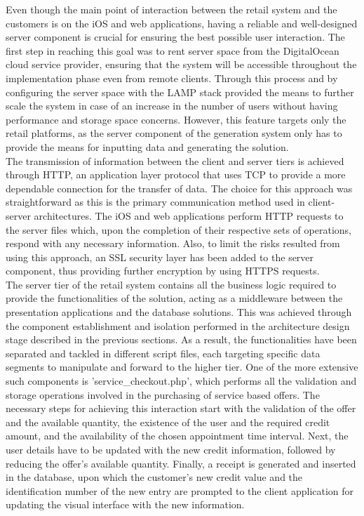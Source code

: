 Even though the main point of interaction between the retail system and the customers is on the iOS and web applications, having a reliable and well-designed server component is crucial for ensuring the best possible user interaction. The first step in reaching this goal was to rent server space from the DigitalOcean cloud service provider, ensuring that the system will be accessible throughout the implementation phase even from remote clients. Through this process and by configuring the server space with the LAMP stack provided the means to further scale the system in case of an increase in the number of users without having performance and storage space concerns. However, this feature targets only the retail platforms, as the server component of the generation system only has to provide the means for inputting data and generating the solution.\\

The transmission of information between the client and server tiers is achieved through HTTP, an application layer protocol that uses TCP to provide a more dependable connection for the transfer of data. The choice for this approach was straightforward as this is the primary communication method used in client-server architectures. The iOS and web applications perform HTTP requests to the server files which, upon the completion of their respective sets of operations, respond with any necessary information. Also, to limit the risks resulted from using this approach, an SSL security layer has been added to the server component, thus providing further encryption by using HTTPS requests.\\

The server tier of the retail system contains all the business logic required to provide the functionalities of the solution, acting as a middleware between the presentation applications and the database solutions. This was achieved through the component establishment and isolation performed in the architecture design stage described in the previous sections. As a result, the functionalities have been separated and tackled in different script files, each targeting specific data segments to manipulate and forward to the higher tier. One of the more extensive such components is 'service\_checkout.php', which performs all the validation and storage operations involved in the purchasing of service based offers. The necessary steps for achieving this interaction start with the validation of the offer and the available quantity, the existence of the user and the required credit amount, and the availability of the chosen appointment time interval. Next, the user details have to be updated with the new credit information, followed by reducing the offer's available quantity. Finally, a receipt is generated and inserted in the database, upon which the customer's new credit value and the identification number of the new entry are prompted to the client application for updating the visual interface with the new information. 

